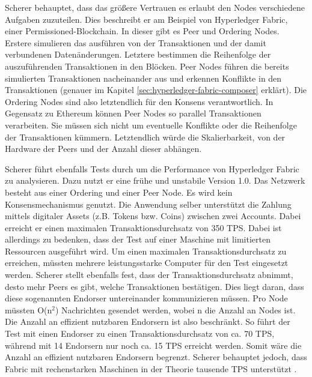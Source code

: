 Scherer behauptet, dass das größere Vertrauen es erlaubt den Nodes verschiedene Aufgaben zuzuteilen. Dies beschreibt er am Beispiel von Hyperledger Fabric, einer Permissioned-Blockchain. In dieser gibt es Peer und Ordering Nodes. Erstere simulieren das ausführen von der Transaktionen und der damit verbundenen Datenänderungen. Letztere bestimmen die Reihenfolge der auszuführenden Transaktionen in den Blöcken. Peer Nodes führen die bereits simulierten Transaktionen nacheinander aus und erkennen Konflikte in den Transaktionen (genauer im Kapitel \ref{sec:hyperledger-fabric-composer} erklärt). Die Ordering Nodes sind also letztendlich für den Konsens verantwortlich. In Gegensatz zu Ethereum können Peer Nodes so parallel Transaktionen verarbeiten. Sie müssen sich nicht um eventuelle Konflikte oder die Reihenfolge der Transaktionen kümmern. Letztendlich würde die Skalierbarkeit, von der Hardware der Peers und der Anzahl dieser abhängen.

Scherer führt ebenfalls Tests durch um die Performance von Hyperledger Fabric zu analysieren. Dazu nutzt er eine frühe und unstabile Version 1.0. Das Netzwerk besteht aus einer Ordering und einer Peer Node. Es wird kein Konsensmechanismus genutzt. Die Anwendung selber unterstützt die Zahlung mittels digitaler Assets (z.B. Tokens bzw. Coins) zwischen zwei Accounts. Dabei erreicht er einen maximalen Transaktionsdurchsatz von 350 TPS. Dabei ist allerdings zu bedenken, dass der Test auf einer Maschine mit limitierten Ressourcen ausgeführt wird. Um einen maximalen Transaktionsdurchsatz zu erreichen, müssten mehrere leistungsstarke Computer für den Test eingesetzt werden. Scherer stellt ebenfalls fest, dass der Transaktionsdurchsatz abnimmt, desto mehr Peers es gibt, welche Transaktionen bestätigen. Dies liegt daran, dass diese sogenannten Endorser untereinander kommunizieren müssen. Pro Node müssten O(n$^2$) Nachrichten gesendet werden, wobei n die Anzahl an Nodes ist. Die Anzahl an effizient nutzbaren Endorsern ist also beschränkt. So führt der Test mit einen Endorser zu einen Transaktionsdurchsatz von ca. 70 TPS, während mit 14 Endorsern nur noch ca. 15 TPS erreicht werden. Somit wäre die Anzahl an effizient nutzbaren Endorsern begrenzt. Scherer behauptet jedoch, dass Fabric mit rechenstarken Maschinen in der Theorie tausende TPS unterstützt \cite{SchererPerformanceScalabilityBlockchain2017}.

